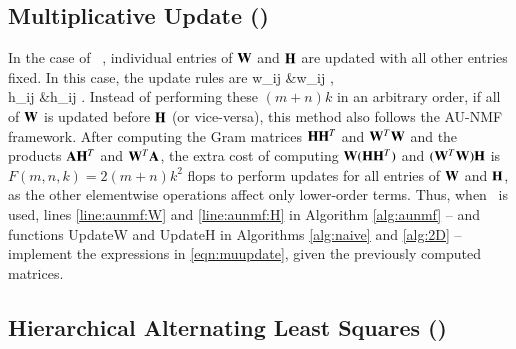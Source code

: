 



\subsection{Multiplicative Update (\MU)}
\label{sec:MU}

In the case of \MU\ \cite{seung2001algorithms}, individual entries of $\mathbf{W}$ and $\mathbf{H}$ are updated with all other entries fixed.
In this case, the update rules are 
\SplitN{\label{eqn:muupdate}} {
w_{ij} &\leftarrow w_{ij} , \\
h_{ij} &\leftarrow  h_{ij} .
} 
Instead of performing these $(m+n)k$ in an arbitrary order, if all of $\mathbf{W}$ is updated before $\mathbf{H}$ (or vice-versa), this method also follows the AU-NMF framework.
After computing the Gram matrices $\mathbf{H}\mathbf{H}^T$ and $\mathbf{W}^T \mathbf{W}$ and the products $\mathbf{A}\mathbf{H}^T$ and $\mathbf{W}^T\mathbf{A}$, the extra cost of computing $\mathbf{W} (\mathbf{H}\mathbf{H}^T)$ and $(\mathbf{W}^T\mathbf{W})\mathbf{H}$ is $F(m,n,k)=2(m+n)k^2$ flops to perform updates for all entries of $\mathbf{W}$ and $\mathbf{H}$, as the other elementwise operations affect only lower-order terms.
Thus, when \MU\ is used, lines \ref{line:aunmf:W} and \ref{line:aunmf:H} in Algorithm \ref{alg:aunmf} -- and functions UpdateW and UpdateH in Algorithms \ref{alg:naive} and \ref{alg:2D} -- implement the expressions in \eqref{eqn:muupdate}, given the previously computed matrices.  


\subsection{Hierarchical Alternating Least Squares (\HALS)}
\label{sec:HALS}

